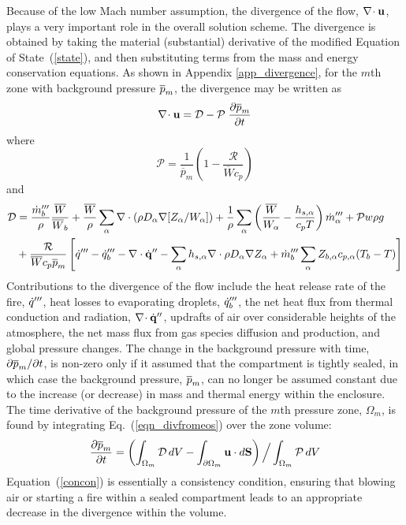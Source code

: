 Because of the low Mach number assumption, the divergence of the flow, $\nabla\!\cdot {\bf u}$, plays a very important role in the overall solution scheme. The divergence is obtained by taking the material (substantial) derivative
of the modified Equation of State~(\ref{state}), and then substituting terms from the mass
and energy conservation equations. As shown in Appendix \ref{app_divergence}, for the $m$th zone with background pressure $\overline{p}_m$, the divergence may be written as
\begin{equation}
\label{eqn_divfromeos}
\nabla\!\cdot {\bf u} = {\cal D} - {\cal P}\; \frac{\partial \overline{p}_m}{\partial t}
\end{equation}
where
\begin{equation}
\label{eqn_fdsP1}
\mathcal{P} = \frac{1}{\overline{p}_m}\left( 1 - \frac{\mathcal{R}}{\overline{W} c_p}  \right)
\end{equation}
and
\begin{align}
\label{eqn_fdsD1}
\mathcal{D} &= \frac{\dot{m}_b^{\prime\prime\prime}}{\rho}\frac{\overline{W}}{\overline{W}_b} +
\frac{\overline{W}}{\rho} \sum_\alpha \nabla\cdot \left( \rho D_\alpha \nabla[Z_\alpha/W_\alpha] \right) +
\frac{1}{\rho}\sum_\alpha \left( \frac{\overline{W}}{W_\alpha} -
\frac{h_{s,\alpha}}{c_p T} \right) \dot{m}_{\alpha}^{\prime\prime\prime}  + \mathcal{P} w \rho g \nonumber  \\
&+ \frac{\mathcal{R}}{\overline{W} c_p \overline{p}_m} \left[ \dot{q}^{\prime\prime\prime} - \dot{q}_b''' -
\nabla\cdot \dot{\mathbf{q}}^{\prime\prime} - \sum_\alpha h_{s,\alpha} \nabla\cdot \rho D_\alpha \nabla Z_\alpha +
\dot{m}_{b}^{{\prime\prime\prime}} \sum_\alpha Z_{b,\alpha} c_{p,\alpha}(T_b-T)  \right]
\end{align}
Contributions to the divergence of the flow include the heat release rate of the fire, $\dot{q}'''$, heat losses to evaporating droplets,
$\dot{q}_b'''$, the net heat flux from thermal conduction and radiation, $\nabla\!\cdot \dot{\bf q}''$, updrafts of air over considerable heights of
the atmosphere, the net mass flux from gas species diffusion and production, and global pressure changes. The change in the background
pressure with time, $\partial \overline{p}_m/\partial t$, is non-zero only if
it assumed that the compartment is tightly sealed, in which case the background pressure, $\overline{p}_m$, can no longer be assumed constant due to
the increase (or decrease) in mass and thermal energy within the enclosure. The time derivative of the background pressure of the $m$th
pressure zone, $\Omega_m$, is found by integrating Eq.~(\ref{eqn_divfromeos}) over the zone volume:
\begin{equation}
\frac{\partial \overline{p}_m}{\partial t} = \left( \int_{\Omega_m} {\cal D} \, dV - \int_{\partial \Omega_m} {\bf u} \cdot d{\bf S} \right) \Big/ \int_{\Omega_m} {\cal P} \, dV  \label{concon}
\end{equation}
Equation~(\ref{concon}) is essentially a consistency condition, ensuring that blowing air or starting a fire within a sealed
compartment leads to an appropriate decrease in the divergence within the volume.


